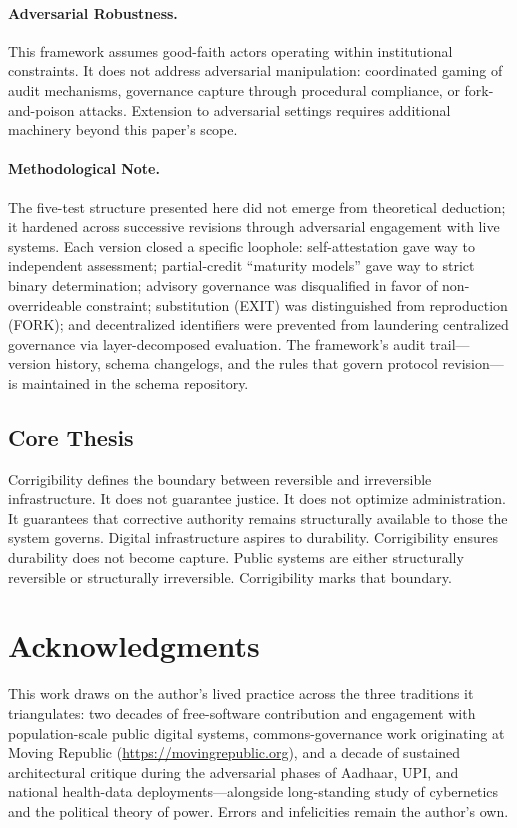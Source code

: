 \documentclass{article}
\begin{document}
\paragraph{Adversarial Robustness.} This framework assumes good-faith actors operating within institutional constraints. It does not address adversarial manipulation: coordinated gaming of audit mechanisms, governance capture through procedural compliance, or fork-and-poison attacks. Extension to adversarial settings requires additional machinery beyond this paper's scope.

\paragraph{Methodological Note.} The five-test structure presented here did not emerge from theoretical deduction; it hardened across successive revisions through adversarial engagement with live systems. Each version closed a specific loophole: self-attestation gave way to independent assessment; partial-credit ``maturity models'' gave way to strict binary determination; advisory governance was disqualified in favor of non-overrideable constraint; substitution (EXIT) was distinguished from reproduction (FORK); and decentralized identifiers were prevented from laundering centralized governance via layer-decomposed evaluation. The framework's audit trail---version history, schema changelogs, and the rules that govern protocol revision---is maintained in the schema repository.

\subsection*{Core Thesis}
Corrigibility defines the boundary between reversible and irreversible infrastructure. It does not guarantee justice. It does not optimize administration. It guarantees that corrective authority remains structurally available to those the system governs. Digital infrastructure aspires to durability. Corrigibility ensures durability does not become capture. Public systems are either structurally reversible or structurally irreversible. Corrigibility marks that boundary.

\section*{Acknowledgments}

This work draws on the author's lived practice across the three traditions it triangulates: two decades of free-software contribution and engagement with population-scale public digital systems, commons-governance work originating at Moving Republic (\url{https://movingrepublic.org}), and a decade of sustained architectural critique during the adversarial phases of Aadhaar, UPI, and national health-data deployments---alongside long-standing study of cybernetics and the political theory of power. Errors and infelicities remain the author's own.
\end{document}
